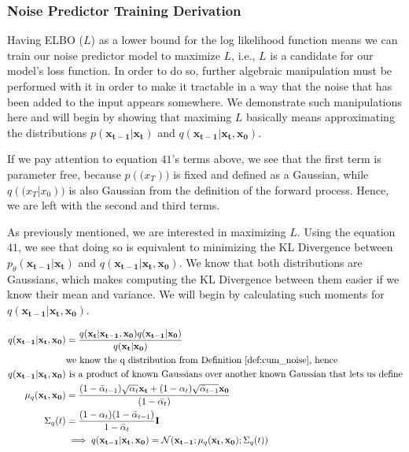 \documentclass{article}
\begin{document}
\subsubsection{Noise Predictor Training Derivation}

Having ELBO ($L$) as a lower bound for the log likelihood function means we can train our noise predictor model to maximize $L$, i.e., $L$ is a candidate for our model's loss function. In order to do so, further algebraic manipulation must be performed with it in order to make it tractable in a way that the noise that has been added to the input appears somewhere. We demonstrate such manipulations here and will begin by showing that maximing $L$ basically means approximating the distributions $p(\mathbf{x_{t-1} | x_t}) $ and $q(\mathbf{x_{t-1} | x_t,  x_0})$.





If we pay attention to equation $41$'s terms above, we see that the first term is parameter free, because $p(\mathbf(x_T))$ is fixed and defined as a Gaussian, while $q(\mathbf(x_T | x_0))$ is also Gaussian from the definition of the forward process. Hence, we are left with the second and third terms. 

As previously mentioned, we are interested in maximizing $L$. Using the equation $41$, we see that doing so is equivalent to minimizing the KL Divergence between $p_\theta (\mathbf{x_{t-1} | x_t})$ and $q(\mathbf{x_{t-1} | x_t,  x_0})$. We know that both distributions are Gaussians, which makes computing the KL Divergence between them easier if we know their mean and variance. We will begin by calculating such moments for $q(\mathbf{x_{t-1} | x_t,  x_0})$.
	
\begin{align}
	 q(\mathbf{x_{t-1} | x_t,  x_0}) &= \frac{q(\mathbf{x_t | x_{t-1}, x_0}) q(\mathbf{x_{t-1}|x_0})}{q(\mathbf{x_t | x_0})} \\
	 & \text{we know the q distribution from Definition \ref{def:cum_noise}, hence } \\ 
	 q(\mathbf{x_{t-1} | x_t,  x_0}) &\text{    is a product of known Gaussians over another known Gaussian that lets us define} \\
	 \mu_q(\mathbf{x_t, x_0}) &= \frac{(1-\bar{\alpha}_{t-1})\sqrt{\alpha_t} \mathbf{x_t} + (1- \alpha_t) \sqrt{\bar{\alpha}_{t-1}  } \mathbf{x_0}}{(1-\bar{\alpha_t})} \\
	 \Sigma_q(t) &= \frac{(1-\alpha_t)(1-\bar{\alpha}_{t-1})}{1 - \bar{\alpha}_t}  \mathbf{I} \\
	 & \implies  q(\mathbf{x_{t-1} | x_t,  x_0}) =   \mathcal{N}(\mathbf{x_{t-1}};  \mu_q(\mathbf{x_t, x_0}); \Sigma_q(t))
\end{align}
\end{document}
